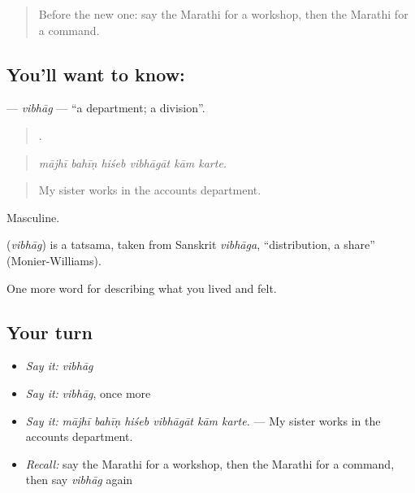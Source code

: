 \label{lesson:MR-C513-vibhag}



\begin{quote}
Before the new one: say the Marathi for a workshop, then the Marathi for a command.
\end{quote}

\subsection*{You'll want to know: }
\textbf{} — \emph{vibhāg} — \textquotedblleft{}a department; a division\textquotedblright{}.

\begin{quote}
     .
\end{quote}

\begin{quote}
\emph{mājhī bahīṇ hiśeb vibhāgāt kām karte.}
\end{quote}

\begin{quote}
My sister works in the accounts department.
\end{quote}

Masculine.

\begin{cousinweb}
\textbf{} (\emph{vibhāg}) is a tatsama, taken from Sanskrit \emph{vibhāga}, \textquotedblleft{}distribution, a share\textquotedblright{} (Monier-Williams).
\end{cousinweb}

\begin{grammarlens}[title={What you've built}]
One more word for describing what you lived and felt.
\end{grammarlens}

\subsection*{Your turn}
\begin{itemize}
\raggedright
  \item \emph{Say it:} \emph{vibhāg}
  \item \emph{Say it:} \emph{vibhāg}, once more
  \item \emph{Say it:} \emph{mājhī bahīṇ hiśeb vibhāgāt kām karte.} — My sister works in the accounts department.
  \item \emph{Recall:} say the Marathi for a workshop, then the Marathi for a command, then say \emph{vibhāg} again
\end{itemize}

